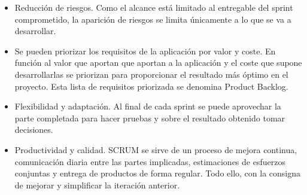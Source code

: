 \begin{itemize}

\item Reducción de riesgos. Como el alcance está limitado al entregable del sprint comprometido, la aparición de riesgos se limita únicamente a lo que se va a desarrollar.

\item Se pueden priorizar los requisitos de la aplicación por valor y coste. En función al valor que aportan que aportan a la aplicación y el coste que supone desarrollarlas se priorizan para proporcionar el resultado más óptimo en el proyecto. Esta lista de requisitos priorizada se denomina Product Backlog.

\item Flexibilidad y adaptación. Al final de cada sprint se puede aprovechar la parte completada para hacer pruebas y sobre el resultado obtenido tomar decisiones.

\item Productividad y calidad. SCRUM se sirve de un proceso de mejora continua, comunicación diaria entre las partes implicadas, estimaciones de esfuerzos conjuntas y entrega de productos de forma regular. Todo ello, con la consigna de mejorar y simplificar la iteración anterior.

\end{itemize}
